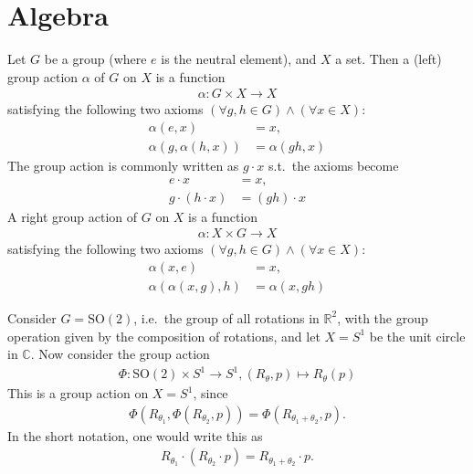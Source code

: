 \section{Algebra}

\begin{defn}[Action]\label{defn:algebra__group_action}
	Let $G$ be a group (where $e$ is the neutral element), and $X$ a set. Then a (left) group action $\alpha$ of $G$ on $X$ is a function
	\begin{align}
		\alpha: G\times X \rightarrow X
	\end{align}
	satisfying the following two axioms $(\forall g, h\in G) \wedge (\forall x\in X)$:
	\begin{align*}
		\alpha(e, x) &= x, 
		\\ \alpha(g, \alpha(h, x)) &= \alpha(gh, x)
	\end{align*}
	The group action is commonly written as $g\cdot x$ s.t.~the axioms become
	\begin{align}\label{eqn:left__group_action}
		e\cdot x &= x, 
		\\ g\cdot \left(h\cdot x\right) &= \left(gh\right)\cdot x
	\end{align}
	A right group action of $G$ on $X$ is a function
	\begin{align}
		\alpha: X\times G \rightarrow X
	\end{align}
	satisfying the following two axioms $(\forall g, h\in G) \wedge (\forall x\in X)$:
	\begin{align}
		\alpha(x, e) &= x, 
		\\ \alpha(\alpha(x, g), h) &= \alpha(x, gh)
	\end{align}
\end{defn}

\begin{exmp}
	Consider $G = \text{SO}(2)$, i.e.~the group of all rotations in $\mathbb R^2$, with the group operation given by the composition of rotations, and let $X = S^1$ be the unit circle in $\mathbb C$. Now consider the group action
	\begin{align}
		\Phi:\text{SO}(2) \times S^{1} \rightarrow S^{1}, (R_{\theta}, p) \mapsto R_{\theta}(p)
	\end{align}
	This is a group action on $X = S^{1}$, since 
	\begin{align*}
		\Phi(R_{\theta_1}, \Phi(R_{\theta_2}, p)) = \Phi(R_{\theta_1 + \theta_2}, p).
	\end{align*}
	In the short notation, one would write this as
	\begin{align*}
		R_{\theta_1}\cdot \left( R_{\theta_2} \cdot p \right) = R_{\theta_1 + \theta_2} \cdot p.
	\end{align*}
\end{exmp}

